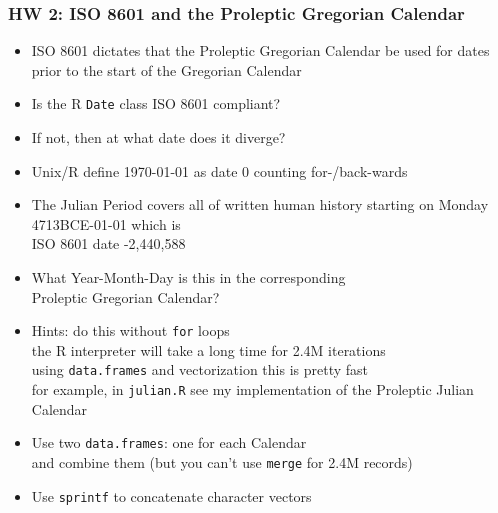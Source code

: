 \documentclass[11pt,pdftex,dvipsnames,usenames,helvetica]{beamer}
\begin{document}
\begin{frame}
\frametitle{HW 2: ISO 8601 and the Proleptic Gregorian Calendar}
\begin{itemize}
\item ISO 8601 dictates that the Proleptic Gregorian Calendar be used
for dates prior to the start of the Gregorian Calendar
\item Is the R {\tt Date} class ISO 8601 compliant?
\item If not, then at what date does it diverge?
\item Unix/R define 1970-01-01 as date 0 counting for-/back-wards
\item The Julian Period covers all of written human history
starting on Monday 4713BCE-01-01 which is \\
ISO 8601 date -2,440,588
\item What Year-Month-Day is this in the corresponding\\
Proleptic Gregorian Calendar?
\item Hints: do this without {\tt for} loops\\
the R interpreter will take a long time for 2.4M iterations\\
using {\tt data.frames} and vectorization this is pretty fast\\
for example, in {\tt julian.R} see my implementation of the 
Proleptic Julian Calendar
\item Use two {\tt data.frames}: one for each Calendar\\
and combine them (but you can't use {\tt merge} for 2.4M records)
\item Use {\tt sprintf} to concatenate character vectors
\end{itemize}

\end{frame}
\end{document}
